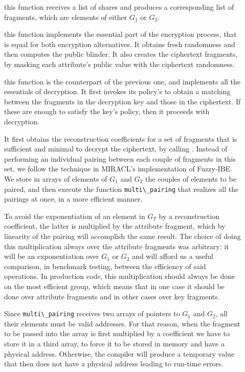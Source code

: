 \documentclass{article}
\begin{document}
\begin{description}
\item[] this function receives a list of shares and produces a corresponding list of fragments, which are elements of either $G_1$ or $G_2$.
\item[] this function implements the essential part of the encryption process, that is equal for both encryption alternatives. It obtains fresh randomness and then computes the public blinder. It also creates the ciphertext fragments, by masking each attribute's public value with the ciphertext randomness.

\item[] this function is the counterpart of the previous one, and implements all the essentials of decryption. It first invokes its policy's  to obtain a matching between the fragments in the decryption key and those in the ciphertext. If these are enough to satisfy the key's policy, then it proceeds with decryption.

It first obtains the reconstruction coefficients for a set of fragments that is sufficient and minimal to decrypt the ciphertext, by calling . Instead of performing an individual pairing between each couple of fragments in this set, we follow the technique in MIRACL's implementation of Fuzzy-IBE. We store in arrays of elements of $G_1$ and $G_2$ the couples of elements to be paired, and then execute the \cPFC function \verb|multi\_pairing| that realizes all the pairings at once, in a more efficient manner.

To avoid the exponentiation of an element in $G_T$ by a reconstruction coefficient, the latter is multiplied by the attribute fragment, which by linearity of the pairing will accomplish the same result. The choice of doing this multiplication always over the attribute fragments was arbitrary: it will be an exponentiation over $G_1$ or $G_2$ and will afford us a useful comparison, in benchmark testing, between the efficiency of said operations. In production code, this multiplication should always be done on the most efficient group, which means that in one case it should be done over attribute fragments and in other cases over key fragments.

Since \verb|multi\_pairing| receives two arrays of pointers to $G_1$ and $G_2$, all their elements must be valid addresses. For that reason, when the fragment to be passed into the array is first multiplied by a coefficient we have to store it in a third array, to force it to be stored in memory and have a physical address. Otherwise, the compiler will produce a temporary value that then does not have a physical address leading to run-time errors.
\end{description}
\end{document}
